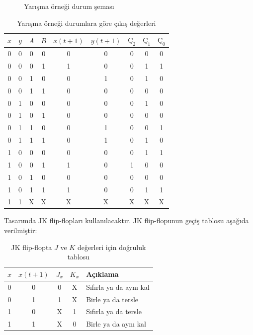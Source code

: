 \begin{ornek}[B.17]
\begin{figure}[H]
\caption*{Yarışma örneği durum şeması}
\end{figure}

\begin{table}[H]
\centering
\caption*{Yarışma örneği durumlara göre çıkış değerleri}
\label{tab:B.17}
\small
\begin{tabular}{cccc|cc|ccc}
\toprule
$x$ & $y$ & $A$ & $B$ & $x(t+1)$ & $y(t+1)$ & $\text{Ç}_2$ & $\text{Ç}_1$ & $\text{Ç}_0$ \\
\midrule
0 & 0 & 0 & 0 & 0 & 0 & 0 & 0 & 0 \\
0 & 0 & 0 & 1 & 1 & 0 & 0 & 1 & 1 \\
0 & 0 & 1 & 0 & 0 & 1 & 0 & 1 & 0 \\
0 & 0 & 1 & 1 & 0 & 0 & 0 & 0 & 0 \\
0 & 1 & 0 & 0 & 0 & 0 & 0 & 1 & 0 \\
0 & 1 & 0 & 1 & 0 & 0 & 0 & 0 & 0 \\
0 & 1 & 1 & 0 & 0 & 1 & 0 & 0 & 1 \\
0 & 1 & 1 & 1 & 0 & 1 & 0 & 1 & 0 \\
1 & 0 & 0 & 0 & 0 & 0 & 0 & 1 & 1 \\
1 & 0 & 0 & 1 & 1 & 0 & 1 & 0 & 0 \\
1 & 0 & 1 & 0 & 0 & 0 & 0 & 0 & 0 \\
1 & 0 & 1 & 1 & 1 & 0 & 0 & 1 & 1 \\
1 & 1 & X & X & X & X & X & X & X \\
\bottomrule
\end{tabular}
\end{table}

Tasarımda JK flip-flopları kullanılacaktır. JK flip-flopunun geçiş tablosu aşağıda verilmiştir:

\begin{table}[H]
\centering
\caption*{JK flip-flopta $J$ ve $K$ değerleri için doğruluk tablosu}
\label{tab:B.18}
\begin{tabular}{cc|cc|l}
\toprule
$x$ & $x(t+1)$ & $J_x$ & $K_x$ & \textbf{Açıklama} \\
\midrule
0 & 0 & 0 & X & Sıfırla ya da aynı kal \\
0 & 1 & 1 & X & Birle ya da tersle \\
1 & 0 & X & 1 & Sıfırla ya da tersle \\
1 & 1 & X & 0 & Birle ya da aynı kal \\
\bottomrule
\end{tabular}
\end{table}


\end{ornek}
